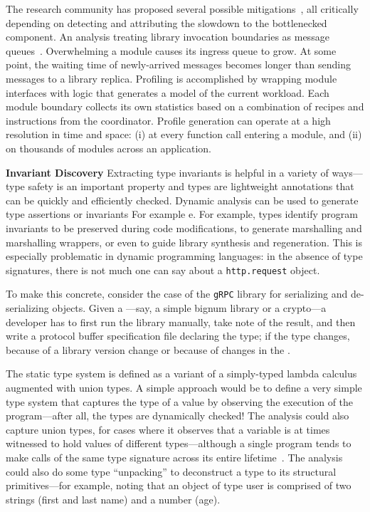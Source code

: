 \documentclass[letterpaper,twocolumn,10pt]{article}
\newcommand{\heading}[1]{\vspace{2pt}\noindent\textbf{#1}\enspace}
\newcommand{\ttt}[1]{\texttt{#1}}
\newcommand{\fixme}[1]{{\color{red}#1}}
\begin{document}
The research community has proposed several possible mitigations~\cite{}, all critically depending on detecting and attributing the slowdown to the bottlenecked component.
An analysis 
treating library invocation boundaries as message queues~\cite{scheme:98, duality:79}.
Overwhelming a module causes its ingress queue to grow.
At some point, the waiting time of newly-arrived messages becomes longer than sending messages to a library replica.
Profiling is accomplished by wrapping module interfaces with logic that generates a model of the current workload.
Each module boundary collects its own statistics based on a combination of recipes and instructions from the coordinator.
Profile generation can operate at a high resolution in time and space:
  (i) at every function call entering a module, and (ii) on thousands of modules across an application.



\heading{Invariant Discovery}
Extracting type invariants is helpful in a variety of ways---type safety is an important property and types are lightweight annotations that can be quickly and efficiently checked.
Dynamic analysis can be used to generate type assertions or invariants
For example
e.
For example, types identify program invariants to be preserved during code modifications, to generate marshalling and marshalling wrappers, or even to guide library synthesis and regeneration.
This is especially problematic in dynamic programming languages:
  in the absence of type signatures, there is not much one can say about a \ttt{http.request} object.

To make this concrete, consider the case of the \ttt{gRPC} library for serializing and de-serializing objects.
Given a ---say, a simple bignum library or a crypto---a developer has to first run the library manually, take note of the result, and then write a protocol buffer specification file declaring the type; %
if the type changes, because of a library version change or because of changes in the .

The static type system is defined as a variant of a simply-typed lambda calculus augmented with union types.
A simple approach would be to define a very simple type system that captures the type of a value by observing the execution of the program---after all, the types are dynamically checked!
The analysis could also capture union types, for cases where it observes that a variable is at times witnessed to hold values of different types---although a single program tends to make calls of the same type signature across its entire lifetime~\cite{daikon}.
The analysis could also do some type ``unpacking'' to deconstruct a type to its structural primitives---for example, noting that an object of type user is comprised of two strings (first and last name) and a number (age).
\end{document}
